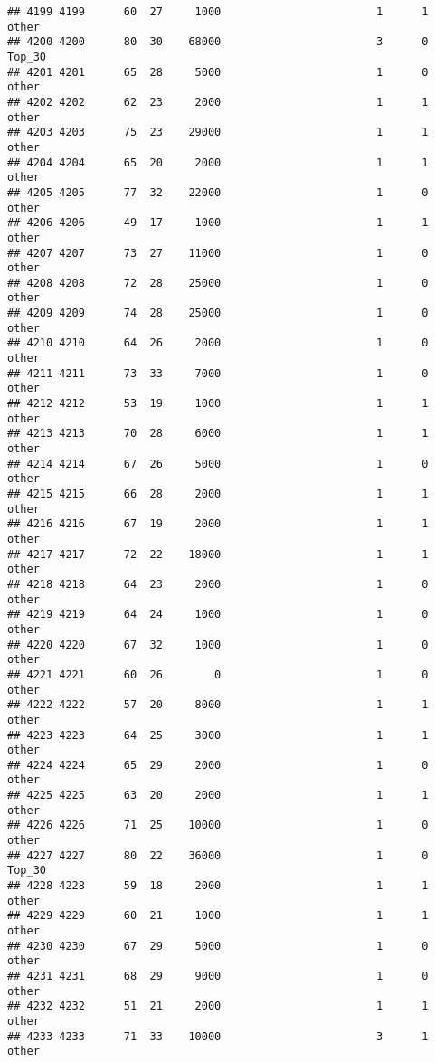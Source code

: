 \documentclass[
]{article}
\begin{document}
\begin{verbatim}
## 4199 4199      60  27     1000                        1      1    other
## 4200 4200      80  30    68000                        3      0   Top_30
## 4201 4201      65  28     5000                        1      0    other
## 4202 4202      62  23     2000                        1      1    other
## 4203 4203      75  23    29000                        1      1    other
## 4204 4204      65  20     2000                        1      1    other
## 4205 4205      77  32    22000                        1      0    other
## 4206 4206      49  17     1000                        1      1    other
## 4207 4207      73  27    11000                        1      0    other
## 4208 4208      72  28    25000                        1      0    other
## 4209 4209      74  28    25000                        1      0    other
## 4210 4210      64  26     2000                        1      0    other
## 4211 4211      73  33     7000                        1      0    other
## 4212 4212      53  19     1000                        1      1    other
## 4213 4213      70  28     6000                        1      1    other
## 4214 4214      67  26     5000                        1      0    other
## 4215 4215      66  28     2000                        1      1    other
## 4216 4216      67  19     2000                        1      1    other
## 4217 4217      72  22    18000                        1      1    other
## 4218 4218      64  23     2000                        1      0    other
## 4219 4219      64  24     1000                        1      0    other
## 4220 4220      67  32     1000                        1      0    other
## 4221 4221      60  26        0                        1      0    other
## 4222 4222      57  20     8000                        1      1    other
## 4223 4223      64  25     3000                        1      1    other
## 4224 4224      65  29     2000                        1      0    other
## 4225 4225      63  20     2000                        1      1    other
## 4226 4226      71  25    10000                        1      0    other
## 4227 4227      80  22    36000                        1      0   Top_30
## 4228 4228      59  18     2000                        1      1    other
## 4229 4229      60  21     1000                        1      1    other
## 4230 4230      67  29     5000                        1      0    other
## 4231 4231      68  29     9000                        1      0    other
## 4232 4232      51  21     2000                        1      1    other
## 4233 4233      71  33    10000                        3      1    other

\end{verbatim}
\end{document}
